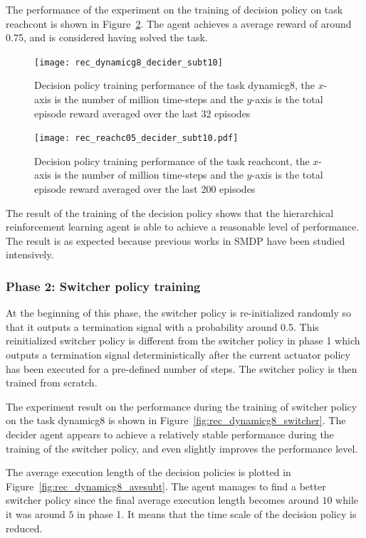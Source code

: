 The performance of the experiment on the training of decision policy on task reachcont is shown in Figure~\ref{fig:rec_reachc05_decider_subt10}. The agent achieves a average reward of around 0.75, and is considered having solved the task.


\begin{figure}[!htbp]
\centering
\texttt{[image: rec\_dynamicg8\_decider\_subt10]}
\caption{Decision policy training performance of the task dynamicg8, the $x$-axis is the number of million time-steps and the $y$-axis is the total episode reward averaged over the last 32 episodes}
\label{fig:rec_dynamicg8_decider_subt10}
\end{figure}


\begin{figure}
\centering
\texttt{[image: rec\_reachc05\_decider\_subt10.pdf]}
\caption{Decision policy training performance of the task reachcont, the $x$-axis is the number of million time-steps and the $y$-axis is the total episode reward averaged over the last 200 episodes}
\label{fig:rec_reachc05_decider_subt10}
\end{figure}

The result of the training of the decision policy shows that the hierarchical reinforcement learning agent is able to achieve a reasonable level of performance. The result is as expected because previous works in SMDP have been studied intensively.

\subsubsection{Phase 2: Switcher policy training}
At the beginning of this phase, the switcher policy is re-initialized randomly so that it outputs a termination signal with a probability around 0.5. This reinitialized switcher policy is different from the switcher policy in phase 1 which outputs a termination signal deterministically after the current actuator policy has been executed for a pre-defined number of steps. The switcher policy is then trained from scratch.

The experiment result on the performance during the training of switcher policy on the task dynamicg8 is shown in Figure~\ref{fig:rec_dynamicg8_switcher}. The decider agent appears to achieve a relatively stable performance during the training of the switcher policy, and even slightly improves the performance level.

The average execution length of the decision policies is plotted in Figure~\ref{fig:rec_dynamicg8_avesubt}. The agent manages to find a better switcher policy since the final average execution length becomes around $10$ while it was around $5$ in phase 1. It means that the time scale of the decision policy is reduced.

